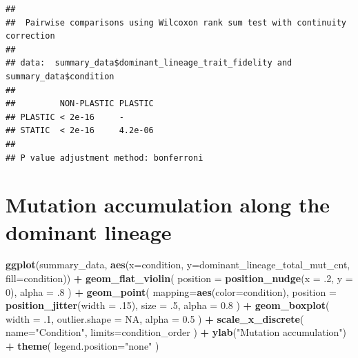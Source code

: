 \documentclass[]{book}
\newenvironment{Shaded}{\begin{snugshade}}{\end{snugshade}}
\newcommand{\DataTypeTok}[1]{\textcolor[rgb]{0.13,0.29,0.53}{#1}}
\newcommand{\DecValTok}[1]{\textcolor[rgb]{0.00,0.00,0.81}{#1}}
\newcommand{\FloatTok}[1]{\textcolor[rgb]{0.00,0.00,0.81}{#1}}
\newcommand{\KeywordTok}[1]{\textcolor[rgb]{0.13,0.29,0.53}{\textbf{#1}}}
\newcommand{\NormalTok}[1]{#1}
\newcommand{\OperatorTok}[1]{\textcolor[rgb]{0.81,0.36,0.00}{\textbf{#1}}}
\newcommand{\OtherTok}[1]{\textcolor[rgb]{0.56,0.35,0.01}{#1}}
\newcommand{\StringTok}[1]{\textcolor[rgb]{0.31,0.60,0.02}{#1}}
\begin{document}
\begin{verbatim}
## 
##  Pairwise comparisons using Wilcoxon rank sum test with continuity correction 
## 
## data:  summary_data$dominant_lineage_trait_fidelity and summary_data$condition 
## 
##         NON-PLASTIC PLASTIC
## PLASTIC < 2e-16     -      
## STATIC  < 2e-16     4.2e-06
## 
## P value adjustment method: bonferroni
\end{verbatim}

\hypertarget{mutation-accumulation-along-the-dominant-lineage}{%
\section{Mutation accumulation along the dominant lineage}\label{mutation-accumulation-along-the-dominant-lineage}}

\begin{Shaded}
\begin{Highlighting}[]
\KeywordTok{ggplot}\NormalTok{(summary_data, }\KeywordTok{aes}\NormalTok{(}\DataTypeTok{x=}\NormalTok{condition, }\DataTypeTok{y=}\NormalTok{dominant_lineage_total_mut_cnt, }\DataTypeTok{fill=}\NormalTok{condition)) }\OperatorTok{+}
\StringTok{  }\KeywordTok{geom_flat_violin}\NormalTok{(}
    \DataTypeTok{position =} \KeywordTok{position_nudge}\NormalTok{(}\DataTypeTok{x =} \FloatTok{.2}\NormalTok{, }\DataTypeTok{y =} \DecValTok{0}\NormalTok{),}
    \DataTypeTok{alpha =} \FloatTok{.8}
\NormalTok{  ) }\OperatorTok{+}
\StringTok{  }\KeywordTok{geom_point}\NormalTok{(}
    \DataTypeTok{mapping=}\KeywordTok{aes}\NormalTok{(}\DataTypeTok{color=}\NormalTok{condition),}
    \DataTypeTok{position =} \KeywordTok{position_jitter}\NormalTok{(}\DataTypeTok{width =} \FloatTok{.15}\NormalTok{),}
    \DataTypeTok{size =} \FloatTok{.5}\NormalTok{,}
    \DataTypeTok{alpha =} \FloatTok{0.8}
\NormalTok{  ) }\OperatorTok{+}
\StringTok{  }\KeywordTok{geom_boxplot}\NormalTok{(}
    \DataTypeTok{width =} \FloatTok{.1}\NormalTok{,}
    \DataTypeTok{outlier.shape =} \OtherTok{NA}\NormalTok{,}
    \DataTypeTok{alpha =} \FloatTok{0.5}
\NormalTok{  ) }\OperatorTok{+}
\StringTok{  }\KeywordTok{scale_x_discrete}\NormalTok{(}
    \DataTypeTok{name=}\StringTok{"Condition"}\NormalTok{,}
    \DataTypeTok{limits=}\NormalTok{condition_order}
\NormalTok{  ) }\OperatorTok{+}
\StringTok{  }\KeywordTok{ylab}\NormalTok{(}\StringTok{"Mutation accumulation"}\NormalTok{) }\OperatorTok{+}
\StringTok{  }\KeywordTok{theme}\NormalTok{(}
    \DataTypeTok{legend.position=}\StringTok{"none"}
\NormalTok{  )}
\end{Highlighting}
\end{Shaded}
\end{document}
